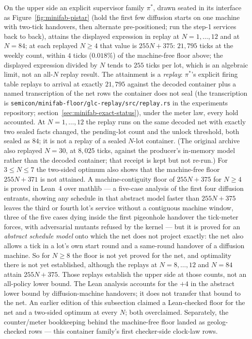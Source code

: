 On the upper side an explicit supervisor family $\pi^{\ast}$,
drawn seated in its interface as Figure~\ref{fig:minifab-pistar}
(hold the first few diffusion starts on one machine with two-tick
handovers, then alternate pre-positioned; run the step-1 services
back to back), attains the displayed expression in replay at
$N = 1, \dots, 12$ and at $N = 84$; at each replayed $N \ge 4$ that
value is $255N + 375$: $21{,}795$ ticks at the weekly count, within
$4$ ticks ($0.018\%$) of the machine-free floor above; the displayed
expression divided by $N$ tends to $255$ ticks per lot, which is an
algebraic limit, not an all-$N$ replay result. The attainment is a \emph{replay}:
$\pi^{\ast}$'s explicit firing table replays to arrival at exactly
$21{,}795$ against the decoded container plus a named transcription
of the net rows the container does not seal (the transcription is
\texttt{semicon/minifab-floor/glc-replay/src/replay.rs} in the
experiments repository; section~\ref{sec:minifab-exact-status}),
under the meter law, every
hold accounted. At $N = 1, \dots, 12$ the replay runs on the same
decoded net with exactly two sealed facts changed, the pending-lot
count and the unlock threshold, both sealed as $84$; it is not a
replay of a sealed $N$-lot container. (The original archive also
replayed $N = 30$, at $8{,}025$ ticks, against the producer's
in-memory model rather than the decoded container; that receipt is
kept but not re-run.) For $3 \le N \le 7$ the two-sided optimum also
shows that the machine-free floor $255N + 371$ is not attained. A
machine-contiguity floor of $255N + 375$ for $N \ge 4$ is proved in
Lean~4 over mathlib --- a five-case analysis of the first four
diffusion entrants, showing any schedule in that abstract model
faster than $255N + 375$ leaves the third or fourth lot's service without a contiguous
machine window, three of the five cases dying inside the first
pigeonhole handover the tick-meter forces, with adversarial mutants
refused by the kernel --- but it is proved for an \emph{abstract
schedule model} onto which the net does not project exactly: the net
also allows a tick in a lot's own start round and a same-round
handover of a diffusion machine. So for $N \ge 8$ the floor is not
yet proved for the net, and optimality there is not yet established,
although
the replays at $N = 8, \dots, 12$ and $N = 84$ attain $255N + 375$.
Those replays establish the upper side at those counts, not an
all-policy lower bound. The Lean analysis accounts for the $+4$ in
the abstract lower bound by diffusion-machine handovers; it does not
transfer that bound to the net. An earlier edition of this
subsection claimed a Lean-checked floor for the net and a two-sided
optimum at every $N$; both overclaimed.
Separately, the counter/meter bookkeeping behind
the machine-free floor landed as geolog-checked rows --- this
container family's first checker-side clock-law rows.

